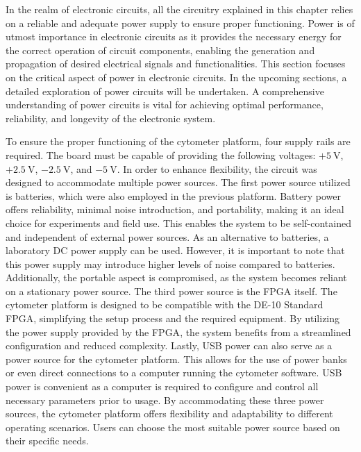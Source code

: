 In the realm of electronic circuits, all the circuitry explained in this chapter relies on a reliable and adequate power supply to ensure proper functioning. Power is of utmost importance in electronic circuits as it provides the necessary energy for the correct operation of circuit components, enabling the generation and propagation of desired electrical signals and functionalities. This section focuses on the critical aspect of power in electronic circuits. In the upcoming sections, a detailed exploration of power circuits will be undertaken. A comprehensive understanding of power circuits is vital for achieving optimal performance, reliability, and longevity of the electronic system.

To ensure the proper functioning of the cytometer platform, four supply rails are required. The board must be capable of providing the following voltages: $\mathrm{+5~V}$, $\mathrm{+2.5~V}$, $\mathrm{-2.5~V}$, and $\mathrm{-5~V}$. In order to enhance flexibility, the circuit was designed to accommodate multiple power sources. The first power source utilized is batteries, which were also employed in the previous platform. Battery power offers reliability, minimal noise introduction, and portability, making it an ideal choice for experiments and field use. This enables the system to be self-contained and independent of external power sources. As an alternative to batteries, a laboratory \ac{DC} power supply can be used. However, it is important to note that this power supply may introduce higher levels of noise compared to batteries. Additionally, the portable aspect is compromised, as the system becomes reliant on a stationary power source. The third power source is the \ac{FPGA} itself. The cytometer platform is designed to be compatible with the DE-10 Standard \ac{FPGA}, simplifying the setup process and the required equipment. By utilizing the power supply provided by the \ac{FPGA}, the system benefits from a streamlined configuration and reduced complexity. Lastly, \ac{USB} power can also serve as a power source for the cytometer platform. This allows for the use of power banks or even direct connections to a computer running the cytometer software. \ac{USB} power is convenient as a computer is required to configure and control all necessary parameters prior to usage. By accommodating these three power sources, the cytometer platform offers flexibility and adaptability to different operating scenarios. Users can choose the most suitable power source based on their specific needs.

